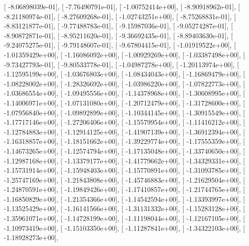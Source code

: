 \documentclass{article}
\begin{document}
       [ -8.06898039e-01],
       [ -7.76490791e-01],
       [ -1.00752414e+00],
       [ -8.90918962e-01],
       [ -8.21180974e-01],
       [ -8.27609268e-01],
       [ -1.02743251e+00],
       [ -8.75268831e-01],
       [ -8.83121877e-01],
       [ -9.77488783e-01],
       [ -9.15987036e-01],
       [ -9.05274287e-01],
       [ -8.90872871e-01],
       [ -8.95211620e-01],
       [ -9.36692435e-01],
       [ -8.89403630e-01],
       [ -9.24075275e-01],
       [ -9.79148607e-01],
       [ -9.67804415e-01],
       [ -1.01919522e+00],
       [ -1.01359429e+00],
       [ -1.16086092e+00],
       [ -1.00929269e+00],
       [ -1.03387498e+00],
       [ -9.73427793e-01],
       [ -9.80533778e-01],
       [ -1.04987278e+00],
       [ -1.20113974e+00],
       [ -1.12595199e+00],
       [ -1.03676803e+00],
       [ -1.08434043e+00],
       [ -1.16869479e+00],
       [ -1.08228002e+00],
       [ -1.28326692e+00],
       [ -1.03986220e+00],
       [ -1.07822773e+00],
       [ -1.03686554e+00],
       [ -1.09495556e+00],
       [ -1.14378968e+00],
       [ -1.30608995e+00],
       [ -1.14006971e+00],
       [ -1.07131080e+00],
       [ -1.20712479e+00],
       [ -1.31728600e+00],
       [ -1.07956840e+00],
       [ -1.09892899e+00],
       [ -1.10344145e+00],
       [ -1.30915549e+00],
       [ -1.17717146e+00],
       [ -1.27206406e+00],
       [ -1.15579954e+00],
       [ -1.11416212e+00],
       [ -1.12784883e+00],
       [ -1.12914125e+00],
       [ -1.41907139e+00],
       [ -1.36912394e+00],
       [ -1.16318857e+00],
       [ -1.18151662e+00],
       [ -1.39229774e+00],
       [ -1.17555359e+00],
       [ -1.14673265e+00],
       [ -1.12574794e+00],
       [ -1.17135048e+00],
       [ -1.33740650e+00],
       [ -1.12987168e+00],
       [ -1.13379177e+00],
       [ -1.41779662e+00],
       [ -1.34329331e+00],
       [ -1.15731914e+00],
       [ -1.15948403e+00],
       [ -1.15770891e+00],
       [ -1.31093785e+00],
       [ -1.25747169e+00],
       [ -1.21843808e+00],
       [ -1.45746883e+00],
       [ -1.21629504e+00],
       [ -1.24870591e+00],
       [ -1.19849426e+00],
       [ -1.17410857e+00],
       [ -1.21744765e+00],
       [ -1.16850829e+00],
       [ -1.21354366e+00],
       [ -1.14542594e+00],
       [ -1.13393997e+00],
       [ -1.13525429e+00],
       [ -1.16141566e+00],
       [ -1.31131332e+00],
       [ -1.15283128e+00],
       [ -1.35961071e+00],
       [ -1.14728199e+00],
       [ -1.11198044e+00],
       [ -1.12167105e+00],
       [ -1.10973419e+00],
       [ -1.15103350e+00],
       [ -1.11287841e+00],
       [ -1.34322103e+00],
       [ -1.18928273e+00],
\end{document}
